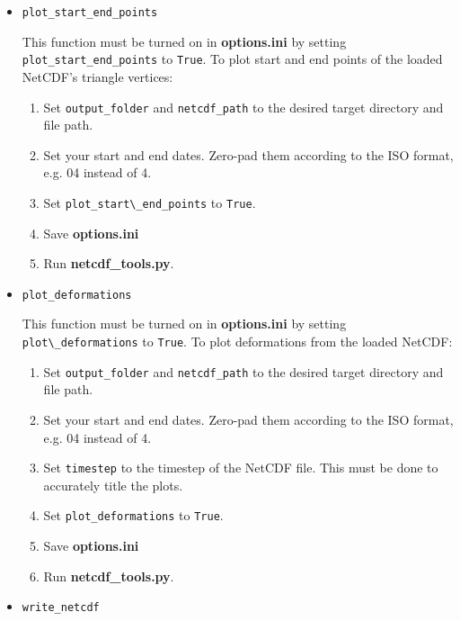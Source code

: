 \documentclass{article}
\begin{document}
        \begin{itemize}
            \item{} \verb?plot_start_end_points?

            This function must be turned on in \textbf{options.ini} by setting \verb?plot_start_end_points? to \verb?True?. To plot start and end points of the loaded NetCDF's triangle vertices:
            \begin{enumerate}
                \item Set \verb?output_folder? and \verb?netcdf_path? to the desired target directory and file path.
                \item Set your start and end dates. Zero-pad them according to the ISO format, e.g. 04 instead of 4.
                \item Set \verb?plot_start\_end_points? to \verb?True?.
                \item Save \textbf{options.ini}
                \item Run \textbf{netcdf\_tools.py}.
            \end{enumerate}

            \item{} \verb?plot_deformations?

            This function must be turned on in \textbf{options.ini} by setting \verb?plot\_deformations? to \verb?True?. To plot deformations from the loaded NetCDF:
            \begin{enumerate}
                \item Set \verb?output_folder? and \verb?netcdf_path? to the desired target directory and file path.
                \item Set your start and end dates. Zero-pad them according to the ISO format, e.g. 04 instead of 4.
                \item Set \verb?timestep? to the timestep of the NetCDF file. This must be done to accurately title the plots.
                \item Set \verb?plot_deformations? to \verb?True?.
                \item Save \textbf{options.ini}
                \item Run \textbf{netcdf\_tools.py}.
            \end{enumerate}

            \item{} \verb?write_netcdf?


\end{itemize}
\end{document}
